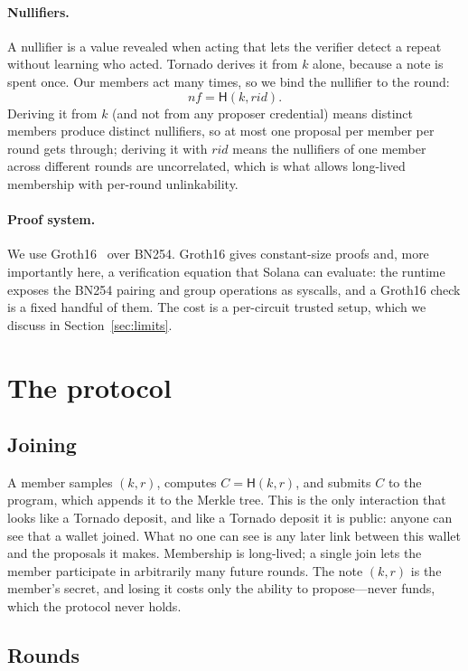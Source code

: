 \documentclass[11pt]{article}
\newcommand{\hash}{\mathsf{H}}
\begin{document}
\paragraph{Nullifiers.} A nullifier is a value revealed when acting that lets the
verifier detect a repeat without learning who acted. Tornado derives it from $k$
alone, because a note is spent once. Our members act many times, so we bind the
nullifier to the round:
\[
  \mathit{nf} = \hash(k, \mathit{rid}).
\]
Deriving it from $k$ (and not from any proposer credential) means distinct
members produce distinct nullifiers, so at most one proposal per member per round
gets through; deriving it with $\mathit{rid}$ means the nullifiers of one member
across different rounds are uncorrelated, which is what allows long-lived
membership with per-round unlinkability.

\paragraph{Proof system.} We use Groth16~\cite{groth16} over BN254. Groth16 gives
constant-size proofs and, more importantly here, a verification equation that
Solana can evaluate: the runtime exposes the BN254 pairing and group operations
as syscalls, and a Groth16 check is a fixed handful of them. The cost is a
per-circuit trusted setup, which we discuss in Section~\ref{sec:limits}.

\section{The protocol}
\label{sec:protocol}

\subsection{Joining}

A member samples $(k, r)$, computes $C = \hash(k, r)$, and submits $C$ to the
program, which appends it to the Merkle tree. This is the only interaction that
looks like a Tornado deposit, and like a Tornado deposit it is public: anyone can
see that a wallet joined. What no one can see is any later link between this
wallet and the proposals it makes. Membership is long-lived; a single join lets
the member participate in arbitrarily many future rounds. The note $(k, r)$ is
the member's secret, and losing it costs only the ability to propose---never
funds, which the protocol never holds.

\subsection{Rounds}
\label{sec:rounds}
\end{document}
